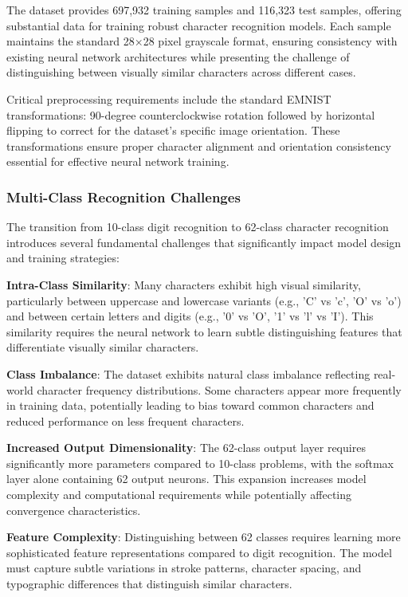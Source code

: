 \documentclass[11pt,a4paper]{report}
\begin{document}
The dataset provides 697,932 training samples and 116,323 test samples, offering substantial data for training robust character recognition models. Each sample maintains the standard 28×28 pixel grayscale format, ensuring consistency with existing neural network architectures while presenting the challenge of distinguishing between visually similar characters across different cases.

Critical preprocessing requirements include the standard EMNIST transformations: 90-degree counterclockwise rotation followed by horizontal flipping to correct for the dataset's specific image orientation. These transformations ensure proper character alignment and orientation consistency essential for effective neural network training.

\subsubsection{Multi-Class Recognition Challenges}

The transition from 10-class digit recognition to 62-class character recognition introduces several fundamental challenges that significantly impact model design and training strategies:

\textbf{Intra-Class Similarity}: Many characters exhibit high visual similarity, particularly between uppercase and lowercase variants (e.g., 'C' vs 'c', 'O' vs 'o') and between certain letters and digits (e.g., '0' vs 'O', '1' vs 'l' vs 'I'). This similarity requires the neural network to learn subtle distinguishing features that differentiate visually similar characters.

\textbf{Class Imbalance}: The dataset exhibits natural class imbalance reflecting real-world character frequency distributions. Some characters appear more frequently in training data, potentially leading to bias toward common characters and reduced performance on less frequent characters.

\textbf{Increased Output Dimensionality}: The 62-class output layer requires significantly more parameters compared to 10-class problems, with the softmax layer alone containing 62 output neurons. This expansion increases model complexity and computational requirements while potentially affecting convergence characteristics.

\textbf{Feature Complexity}: Distinguishing between 62 classes requires learning more sophisticated feature representations compared to digit recognition. The model must capture subtle variations in stroke patterns, character spacing, and typographic differences that distinguish similar characters.
\end{document}

